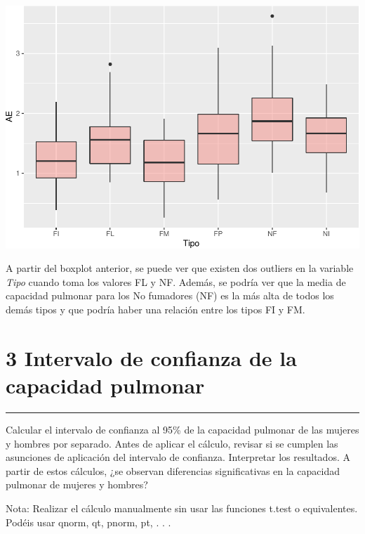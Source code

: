 \documentclass[
]{article}
\begin{document}
\includegraphics{A4_files/figure-latex/unnamed-chunk-23-1.pdf}

\vspace{0.3cm}

A partir del boxplot anterior, se puede ver que existen dos outliers en
la variable \emph{Tipo} cuando toma los valores FL y NF. Además, se
podría ver que la media de capacidad pulmonar para los No fumadores (NF)
es la más alta de todos los demás tipos y que podría haber una relación
entre los tipos FI y FM.

\newpage

\hypertarget{intervalo-de-confianza-de-la-capacidad-pulmonar}{%
\section{3 Intervalo de confianza de la capacidad
pulmonar}\label{intervalo-de-confianza-de-la-capacidad-pulmonar}}

\begin{center}\rule{0.5\linewidth}{0.5pt}\end{center}

\vspace{0.3cm}

Calcular el intervalo de confianza al 95\% de la capacidad pulmonar de
las mujeres y hombres por separado. Antes de aplicar el cálculo, revisar
si se cumplen las asunciones de aplicación del intervalo de confianza.
Interpretar los resultados. A partir de estos cálculos, ¿se observan
diferencias significativas en la capacidad pulmonar de mujeres y
hombres?

Nota: Realizar el cálculo manualmente sin usar las funciones t.test o
equivalentes. Podéis usar qnorm, qt, pnorm, pt, . . .
\end{document}
